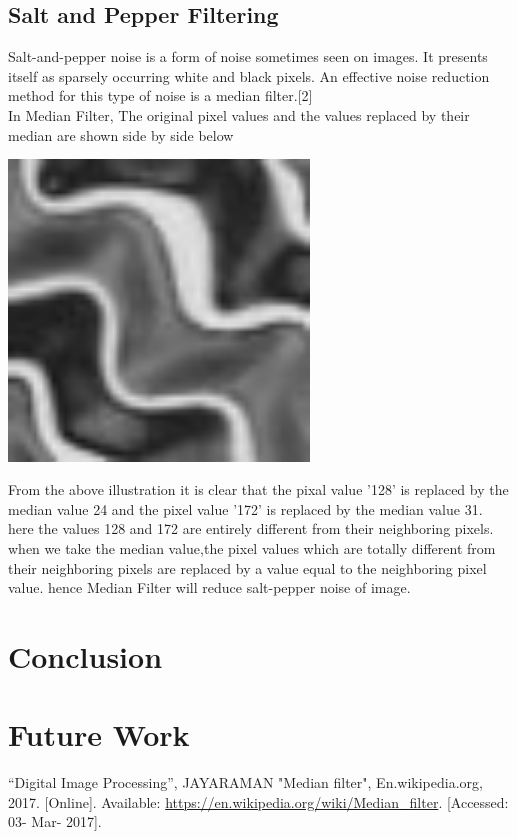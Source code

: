 \documentclass[journal]{IEEEtran}
\begin{document}
	\subsection{\textbf{Salt and Pepper Filtering}}
	Salt-and-pepper noise is a form of noise sometimes seen on images. It presents itself as sparsely occurring white and black pixels. An effective noise reduction method for this type of noise is a median filter.[2]\\
	  In Median Filter,
	 The original pixel values and the values replaced by their median are shown side by side below\\
	\begin{minipage}{\linewidth}
		\centering
		\includegraphics[width = 80mm]{1}
	\end{minipage} 
		
	From the above illustration it is clear that the pixal value '128' is replaced by the median value 24 and the pixel value '172' is replaced by the median value 31. here the values 128 and 172 are entirely different from their neighboring pixels. when we take the median value,the pixel values which are totally different from their neighboring pixels are replaced by a value equal to the neighboring pixel value. hence Median Filter will reduce salt-pepper noise of image. 
	
	\ifCLASSOPTIONcaptionsoff
	\newpage
	\fi
	
	
	
	\section{\textbf{Conclusion}}
		 
	
	
	
    \section{\textbf{Future Work}}
    
	
	
	\begin{thebibliography}{1}
	“Digital Image Processing”, JAYARAMAN
	"Median filter", En.wikipedia.org, 2017. [Online]. Available: \url{https://en.wikipedia.org/wiki/Median_filter}. [Accessed: 03- Mar- 2017].

	
	\end{thebibliography}
	
	
	
\end{document}
